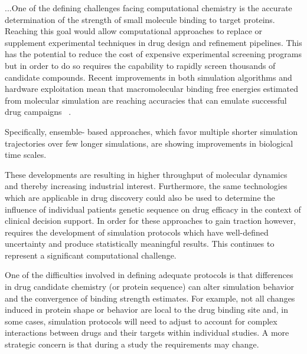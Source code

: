 ...One of the defining challenges facing computational chemistry is the accurate
determination of the strength of small molecule binding to target proteins.
Reaching this goal would allow computational approaches to replace or
supplement experimental techniques in drug design and refinement pipelines.
This has the potential to reduce the cost of expensive experimental screening
programs but in order to do so requires the capability to rapidly screen
thousands of candidate compounds. Recent improvements in both simulation
algorithms and hardware exploitation mean that macromolecular binding free
energies estimated from molecular simulation are reaching accuracies that can
emulate successful drug campaigns ~\cite{DeVivo2016}.

 Specifically, ensemble-
based approaches, which favor multiple shorter simulation trajectories over
few longer simulations, are showing improvements in biological time scales.


 These developments are resulting in
higher throughput of molecular dynamics and thereby increasing industrial
interest. Furthermore, the same technologies which are applicable in drug
discovery could also be used to determine the influence of individual patients
genetic sequence on drug efficacy in the context of clinical decision support.
In order for these approaches to gain traction however, requires the
development of simulation protocols which have well-defined uncertainty
 and produce statistically meaningful results.
This continues to represent a significant computational challenge. 

One of the difficulties involved in defining adequate protocols is that
differences in drug candidate chemistry (or protein sequence) can alter
simulation behavior and the convergence of binding strength estimates. For
example, not all changes induced in protein shape or behavior are local to the
drug binding site and, in some cases, simulation protocols will need to adjust
to account for complex interactions between drugs and their targets within
individual studies. A more strategic concern is that during a study the
requirements may change. 


